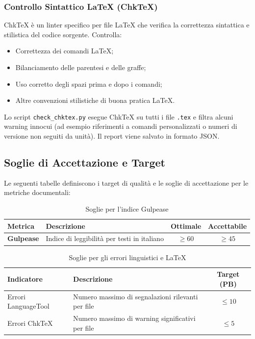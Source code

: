 \documentclass[a4paper,11pt,oneside]{scrartcl}
\begin{document}
\subsubsection{Controllo Sintattico \LaTeX{} (ChkTeX)}

ChkTeX è un linter{\scriptsize{}} specifico per file \LaTeX{} che verifica la correttezza sintattica e stilistica del codice sorgente. Controlla:

\begin{itemize}
    \item Correttezza dei comandi \LaTeX;
    \item Bilanciamento delle parentesi e delle graffe;
    \item Uso corretto degli spazi prima e dopo i comandi;
    \item Altre convenzioni stilistiche di buona pratica \LaTeX.
\end{itemize}

Lo script \texttt{check\_chktex.py} esegue ChkTeX su tutti i file \texttt{.tex} e filtra alcuni warning innocui (ad esempio riferimenti a comandi personalizzati o numeri di versione non seguiti da unità). Il report viene salvato in formato JSON.

\subsection{Soglie di Accettazione e Target}

Le seguenti tabelle definiscono i target di qualità e le soglie di accettazione per le metriche documentali:

\begin{table}[h!]
\centering
\renewcommand{\arraystretch}{1.3}
\begin{tabularx}{\textwidth}{lXcc}
\toprule
\textbf{Metrica} & \textbf{Descrizione} & \textbf{Ottimale} & \textbf{Accettabile} \\
\midrule
\textbf{Gulpease} & Indice di leggibilità per testi in italiano & $\ge 60$ & $\ge 45$ \\
\bottomrule
\end{tabularx}
\caption{Soglie per l'indice Gulpease}
\end{table}

\begin{table}[h!]
\centering
\renewcommand{\arraystretch}{1.3}
\begin{tabularx}{\textwidth}{lXc}
\toprule
\textbf{Indicatore} & \textbf{Descrizione} & \textbf{Target (PB)} \\
\midrule
Errori LanguageTool & Numero massimo di segnalazioni rilevanti per file & $\le 10$ \\
Errori ChkTeX & Numero massimo di warning significativi per file & $\le 5$ \\
\bottomrule
\end{tabularx}
\caption{Soglie per gli errori linguistici e \LaTeX}
\end{table}
\end{document}
